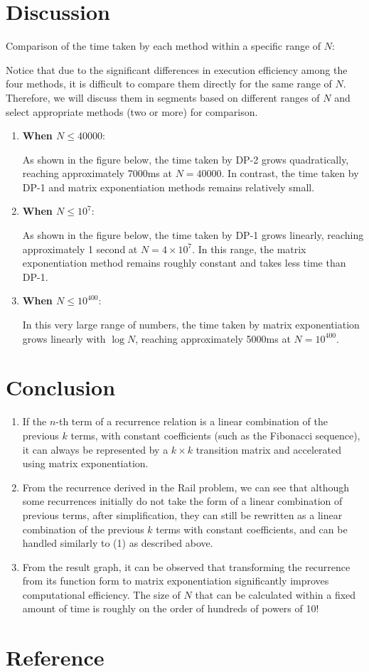\section{Discussion}

Comparison of the time taken by each method within a specific range of $N$:

Notice that due to the significant differences in execution efficiency among the four methods, it is difficult to compare them directly for the same range of $N$. 
Therefore, we will discuss them in segments based on different ranges of $N$ and select appropriate methods (two or more) for comparison.

\begin{enumerate}
    \item \textbf{When $N \leq 40000$}: 
    
    As shown in the figure below, the time taken by DP-2 grows quadratically, reaching approximately 7000ms at \(N=40000\). In contrast, the time taken by DP-1 and matrix exponentiation methods remains relatively small.
    \item \textbf{When $N \leq 10^7$}:
    
    As shown in the figure below, the time taken by DP-1 grows linearly, reaching approximately 1 second at \(N=4 \times 10^7\). In this range, the matrix exponentiation method remains roughly constant and takes less time than DP-1.

    \item \textbf{When $N \leq 10^{400}$}:
    
    In this very large range of numbers, the time taken by matrix exponentiation grows linearly with \( \log N \), reaching approximately 5000ms at \(N = 10^{400}\).
\end{enumerate}

\section{Conclusion}

\begin{enumerate}
    \item If the \(n\)-th term of a recurrence relation is a linear combination of the previous \(k\) terms, with constant coefficients (such as the Fibonacci sequence), it can always be represented by a \(k \times k\) transition matrix and accelerated using matrix exponentiation.
    \item From the recurrence derived in the Rail problem, we can see that although some recurrences initially do not take the form of a linear combination of previous terms, after simplification, they can still be rewritten as a linear combination of the previous \(k\) terms with constant coefficients, and can be handled similarly to (1) as described above.
    \item From the result graph, it can be observed that transforming the recurrence from its function form to matrix exponentiation significantly improves computational efficiency. The size of \(N\) that can be calculated within a fixed amount of time is roughly on the order of hundreds of powers of 10!
\end{enumerate}

\section{Reference}